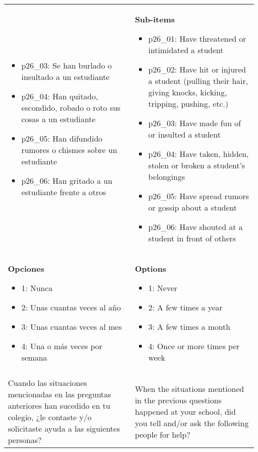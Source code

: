 \documentclass[11pt]{article}
\begin{document}
\begin{longtable}{@{}LL@{}}
\begin{itemize}[leftmargin=*]
\item p26\_03: Se han burlado o insultado a un estudiante
\item p26\_04: Han quitado, escondido, robado o roto sus cosas a un estudiante
\item p26\_05: Han difundido rumores o chismes sobre un estudiante
\item p26\_06: Han gritado a un estudiante frente a otros\end{itemize} & \textbf{Sub-items}\par\begin{itemize}[leftmargin=*]\item p26\_01: Have threatened or intimidated a student
\item p26\_02: Have hit or injured a student (pulling their hair, giving knocks, kicking, tripping, pushing, etc.)
\item p26\_03: Have made fun of or insulted a student
\item p26\_04: Have taken, hidden, stolen or broken a student's belongings
\item p26\_05: Have spread rumors or gossip about a student
\item p26\_06: Have shouted at a student in front of others\end{itemize} \\
\textbf{Opciones}\par\begin{itemize}[leftmargin=*]\item 1: Nunca
\item 2: Unas cuantas veces al año
\item 3: Unas cuantas veces al mes
\item 4: Una o más veces por semana\end{itemize} & \textbf{Options}\par\begin{itemize}[leftmargin=*]\item 1: Never
\item 2: A few times a year
\item 3: A few times a month
\item 4: Once or more times per week\end{itemize} \\
\addlinespace[4pt]
 \\ 
Cuando las situaciones mencionadas en las preguntas anteriores han sucedido en tu colegio, ¿le contaste y/o solicitaste ayuda a las siguientes personas? & When the situations mentioned in the previous questions happened at your school, did you tell and/or ask the following people for help? \\

\end{longtable}
\end{document}
